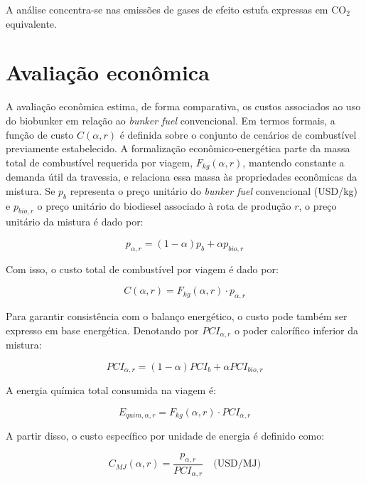 A análise concentra-se nas emissões de gases de efeito estufa expressas em CO$_2$ equivalente.

\section{Avaliação econômica}

A avaliação econômica estima, de forma comparativa, os custos associados ao uso do biobunker em relação ao \emph{bunker fuel} convencional. Em termos formais, a função de custo $C(\alpha,r)$ é definida sobre o conjunto de cenários de combustível previamente estabelecido. A formalização econômico-energética parte da massa total de combustível requerida por viagem, $F_{kg}(\alpha,r)$, mantendo constante a demanda útil da travessia, e relaciona essa massa às propriedades econômicas da mistura. Se $p_b$ representa o preço unitário do \emph{bunker fuel} convencional (USD/kg) e $p_{bio,r}$ o preço unitário do biodiesel associado à rota de produção $r$, o preço unitário da mistura é dado por:

\begin{equation}
p_{\alpha,r} = (1-\alpha)p_b + \alpha p_{bio,r}
\end{equation}

Com isso, o custo total de combustível por viagem é dado por:

\begin{equation}
C(\alpha,r) = F_{kg}(\alpha,r) \cdot p_{\alpha,r}
\end{equation}

Para garantir consistência com o balanço energético, o custo pode também ser expresso em base energética. Denotando por $PCI_{\alpha,r}$ o poder calorífico inferior da mistura:

\begin{equation}
PCI_{\alpha,r} = (1-\alpha)PCI_b + \alpha PCI_{bio,r}
\end{equation}

A energia química total consumida na viagem é:

\begin{equation}
E_{quim,\alpha,r} = F_{kg}(\alpha,r) \cdot PCI_{\alpha,r}
\end{equation}

A partir disso, o custo específico por unidade de energia é definido como:

\begin{equation}
C_{MJ}(\alpha,r) = \frac{p_{\alpha,r}}{PCI_{\alpha,r}}
\quad \text{(USD/MJ)}
\end{equation}

